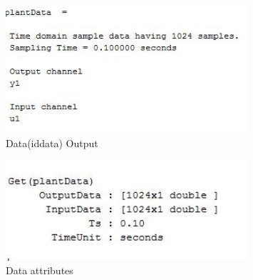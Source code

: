 \documentclass[a4paper,12pt]{report}
\begin{document}
	
			\begin{figure}[tbp]
			\centering
			\includegraphics[width=0.8\textwidth]{datSci1.JPG}
			\caption{Data(iddata) Output}
			\label{}
		\end{figure}
	
			\begin{figure}[tbp]
			\centering
			\includegraphics[width=0.8\textwidth]{datSci.JPG}
			\caption{Data attributes}
			\label{}
		\end{figure}
		
\end{document}
